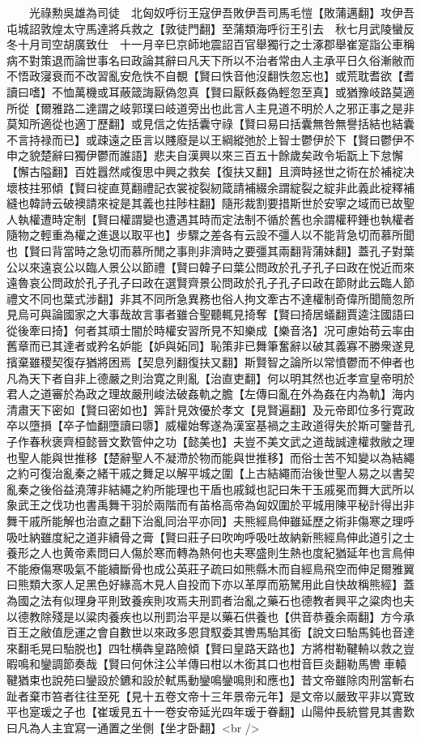 　　光祿勲吳雄為司徒　北匈奴呼衍王寇伊吾敗伊吾司馬毛愷【敗蒲邁翻】攻伊吾屯城詔敦煌太守馬達將兵救之【敦徒門翻】至蒲類海呼衍王引去　秋七月武陵蠻反冬十月司空胡廣致仕　十一月辛巳京師地震詔百官舉獨行之士涿郡舉崔寔詣公車稱病不對策退而論世事名曰政論其辭曰凡天下所以不治者常由人主承平日久俗漸敝而不悟政寖衰而不改習亂安危怢不自覩【賢曰怢音他沒翻怢忽忘也】或荒耽耆欲【耆讀曰嗜】不恤萬機或耳蔽箴誨厭偽忽真【賢曰厭飫姦偽輕忽至真】或猶豫岐路莫適所從【爾雅路二達謂之岐郭璞曰岐道旁出也此言人主見道不明於人之邪正事之是非莫知所適從也適丁歷翻】或見信之佐括囊守祿【賢曰易曰括囊無咎無譽括結也結囊不言持禄而已】或疎遠之臣言以賤廢是以王綱縱弛於上智士鬱伊於下【賢曰鬱伊不申之貌楚辭曰獨伊鬱而誰語】悲夫自漢興以來三百五十餘歲矣政令垢翫上下怠懈【懈古隘翻】百姓囂然咸復思中興之救矣【復扶又翻】且濟時拯世之術在於補䘺决壞枝拄邪傾【賢曰䘺直莧翻禮記衣裳䘺裂紉箴請補綴余謂綻裂之綻非此義此䘺釋補縫也韓詩云破襖請來䘺是其義也拄陟柱翻】隨形裁割要措斯世於安寧之域而已故聖人執權遭時定制【賢曰權謂變也遭遇其時而定法制不循於舊也余謂權秤錘也執權者隨物之輕重為權之進退以取平也】步驟之差各有云設不彊人以不能背急切而慕所聞也【賢曰背當時之急切而慕所閒之事則非濟時之要彊其兩翻背蒲妹翻】蓋孔子對葉公以來遠哀公以臨人景公以節禮【賢曰韓子曰葉公問政於孔子孔子曰政在悦近而來遠魯哀公問政於孔子孔子曰政在選賢齊景公問政於孔子孔子曰政在節財此云臨人節禮文不同也葉式涉翻】非其不同所急異務也俗人拘文牽古不達權制奇偉所聞簡忽所見烏可與論國家之大事哉故言事者雖合聖聽輒見掎奪【賢曰掎居蟻翻賈逵注國語曰從後牽曰掎】何者其頑士闇於時權安習所見不知樂成【樂音洛】况可慮始苟云率由舊章而已其達者或矜名妒能【妒與妬同】恥策非已舞筆奮辭以破其義寡不勝衆遂見擯棄雖稷契復存猶將困焉【契息列翻復扶又翻】斯賢智之論所以常憤鬱而不伸者也凡為天下者自非上德嚴之則治寛之則亂【治直吏翻】何以明其然也近孝宣皇帝明於君人之道審於為政之理故嚴刑峻法破姦軌之膽【左傳曰亂在外為姦在内為軌】海内清肅天下密如【賢曰密如也】筭計見效優於孝文【見賢遍翻】及元帝即位多行寛政卒以墮損【卒子恤翻墮讀曰隳】威權始奪遂為漢室基禍之主政道得失於斯可鑒昔孔子作春秋褒齊桓懿晉文歎管仲之功【懿美也】夫豈不美文武之道哉誠達權救敝之理也聖人能與世推移【楚辭聖人不凝滯於物而能與世推移】而俗士苦不知變以為結繩之約可復治亂秦之緒干戚之舞足以解平城之圍【上古結繩而治後世聖人易之以書契亂秦之後俗益澆薄非結繩之約所能理也干盾也戚鉞也記曰朱干玉戚冕而舞大武所以象武王之伐功也書禹舞干羽於兩階而有苖格高帝為匈奴圍於平城用陳平秘計得出非舞干戚所能解也治直之翻下治亂同治平亦同】夫熊經鳥伸雖延歷之術非傷寒之理呼吸吐納雖度紀之道非續骨之膏【賢曰莊子曰吹呴呼吸吐故納新熊經鳥伸此道引之士養形之人也黄帝素問曰人傷於寒而轉為熱何也夫寒盛則生熱也度紀猶延年也言鳥伸不能療傷寒吸氣不能續斷骨也成公英莊子疏曰如熊縣木而自經鳥飛空而伸足爾雅翼曰熊類大豕人足黑色好緣高木見人自投而下亦以革厚而筋駑用此自快故稱熊經】蓋為國之法有似理身平則致養疾則攻焉夫刑罰者治亂之藥石也德教者興平之粱肉也夫以德教除殘是以粱肉養疾也以刑罰治平是以藥石供養也【供音恭養余兩翻】方今承百王之敝值戹運之會自數世以來政多恩貸馭委其轡馬駘其銜【說文曰駘馬鈍也音達來翻毛晃曰駘脱也】四牡横犇皇路險傾【賢曰皇路天路也】方將柑勒鞬輈以救之豈暇鳴和鑾調節奏哉【賢曰何休注公羊傳曰柑以木銜其口也柑音巨炎翻勒馬轡車轅鞬猶束也說苑曰鑾設於鑣和設於軾馬動鑾鳴鑾鳴則和應也】昔文帝雖除肉刑當斬右趾者棄市笞者往往至死【見十五卷文帝十三年景帝元年】是文帝以嚴致平非以寛致平也寔瑗之子也【崔瑗見五十一卷安帝延光四年瑗于眷翻】山陽仲長統嘗見其書歎曰凡為人主宜寫一通置之坐側【坐才卧翻】<br />
